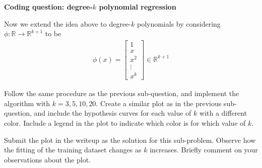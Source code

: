 \item {} {\bf Coding question: degree-$k$ polynomial regression}

Now we extend the idea above to degree-$k$ polynomials by considering $\phi:\mathbb{R}\rightarrow \mathbb{R}^{k+1}$ to be 
		\begin{align}
	\phi(x) = \left[\begin{array}{c} 1\\ x \\ x^2\\ \vdots \\x^k \end{array}\right]\in \mathbb{R}^{k+1} \label{eqn:feature-k}
	\end{align}

Follow the same procedure as the previous sub-question, and implement the algorithm with $k=3,5,10,20$. Create a similar plot as in the previous sub-question, and include the hypothesis curves for each value of $k$ with a different color. Include a legend in the plot to indicate which color is for which value of $k$.


Submit the plot in the writeup as the solution for this sub-problem. Observe how the fitting of the training dataset changes as $k$ increases. Briefly comment on your observations about the plot.


